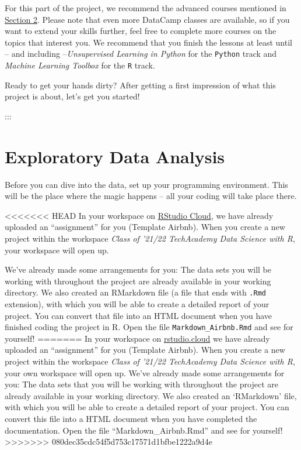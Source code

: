 \documentclass[
  11pt,
]{article}
\newenvironment{tips}[1]
  {
  \begin{itemize}
  \footnotesize
  \renewcommand{\labelitemi}{
    \raisebox{-.7\height}[0pt][0pt]{
      {\setkeys{Gin}{width=3em,keepaspectratio}
        \texttt{[image: images/\#1.png]}}
    }
  }
  \setlength{\fboxsep}{1em}
  \begin{rbox}
  \item
  }
  {
  \end{rbox}
  \end{itemize}
  }
\begin{document}
For this part of the project, we recommend the advanced courses mentioned in \href{https://tech-academy-ev.github.io/whats-data-science-and-how-do-i-do-it.html\#whats-data-science-and-how-do-i-do-it}{Section 2}.
Please note that even more DataCamp classes are available, so if you want to extend your skills further, feel free to complete more courses on the topics that interest you.
We recommend that you finish the lessons at least until -- and including --\emph{Unsupervised Learning in Python} for the \texttt{Python} track and \emph{Machine Learning Toolbox} for the \texttt{R} track.

Ready to get your hands dirty?
After getting a first impression of what this project is about, let's get you started!

:::

\newpage

\hypertarget{exploratory-data-analysis}{%
\section{Exploratory Data Analysis}\label{exploratory-data-analysis}}

Before you can dive into the data, set up your programming environment.
This will be the place where the magic happens -- all your coding will take place there.

\begin{tips}r
<<<<<<< HEAD
In your workspace on \href{https://rstudio.cloud/projects}{RStudio Cloud}, we have already uploaded an ``assignment'' for you (Template Airbnb).
When you create a new project within the workspace \emph{Class of '21/22 \textbar{} TechAcademy \textbar{} Data Science with R}, your workspace will open up.

We've already made some arrangements for you: The data sets you will be working with throughout the project are already available in your working directory.
We also created an RMarkdown file (a file that ends with \texttt{.Rmd} extension), with which you will be able to create a detailed report of your project.
You can convert that file into an HTML document when you have finished coding the project in R.
Open the file \texttt{Markdown\_Airbnb.Rmd} and see for yourself!
=======
In your workspace on \href{https://rstudio.cloud/projects}{rstudio.cloud} we have already uploaded an ``assignment'' for you (Template Airbnb). When you create a new project within the workspace \emph{Class of '21/22 \textbar{} TechAcademy \textbar{} Data Science with R}, your own workspace will open up. We've already made some arrangements for you: The data sets that you will be working with throughout the project are already available in your working directory. We also created an `RMarkdown' file, with which you will be able to create a detailed report of your project. You can convert this file into a HTML document when you have completed the documentation. Open the file ``Markdown\_Airbnb.Rmd'' and see for yourself!
>>>>>>> 080dec35cdc54f5d753c17571d1bfbe1222a9d4e

\end{tips}
\end{document}
